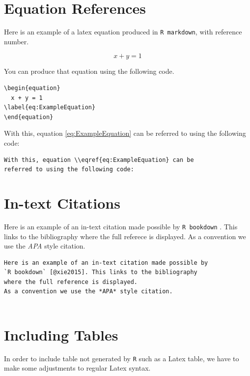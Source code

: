 \documentclass[]{book}
\theoremstyle{definition}
\theoremstyle{definition}
\theoremstyle{definition}
\theoremstyle{remark}
\begin{document}
\section{Equation References}\label{equation-references}

Here is an example of a latex equation produced in \texttt{R\ markdown},
with reference number.

\begin{equation}
  x + y = 1  
\label{eq:ExampleEquation}
\end{equation}

You can produce that equation using the following code.

\begin{verbatim}
\begin{equation}
  x + y = 1  
\label{eq:ExampleEquation}
\end{equation}
\end{verbatim}

With this, equation \eqref{eq:ExampleEquation} can be referred to using
the following code:

\begin{verbatim}
With this, equation \\eqref{eq:ExampleEquation} can be 
referred to using the following code:
\end{verbatim}

\section{In-text Citations}\label{in-text-citations}

Here is an example of an in-text citation made possible by
\texttt{R\ bookdown} \citep{xie2015}. This links to the bibliography
where the full referece is displayed. As a convention we use the
\emph{APA} style citation.

\begin{verbatim}
Here is an example of an in-text citation made possible by 
`R bookdown` [@xie2015]. This links to the bibliography 
where the full reference is displayed. 
As a convention we use the *APA* style citation.
    
\end{verbatim}

\section{Including Tables}\label{including-tables}

In order to include table not generated by \texttt{R} such as a Latex
table, we have to make some adjustments to regular Latex syntax.
\end{document}
